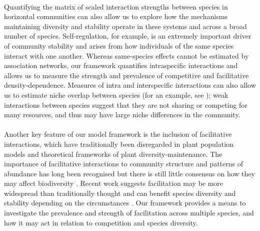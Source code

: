 \documentclass[a4,12pt]{article}
\begin{document}
    \paragraph{}
    Quantifying the matrix of scaled interaction strengths between species in horizontal communities can also allow us to explore how the mechanisms maintaining diversity and stability operate in these systems and across a broad number of species. Self-regulation, for example, is an extremely important driver of community stability \parencite{Barabas2017} and arises from how individuals of the same species interact with one another. Whereas same-species effects cannot be estimated by association networks, our framework quantifies intraspecific interactions and allows us to measure the strength and prevalence of competitive and facilitative density-dependence. Measures of intra and interspecific interactions can also allow us to estimate niche overlap between species (for an example, see \cite{Chu2015a}); weak interactions between species suggest that they are not sharing or competing for many resources, and thus may have large niche differences in the community. %

    \paragraph{}
    Another key feature of our model framework is the inclusion of facilitative interactions, which have traditionally been disregarded in plant population models and theoretical frameworks of plant diversity-maintenance. The importance of facilitative interactions to community structure and patterns of abundance has long been recognised \parencite{Callaway1997a} but there is still little consensus on how they may affect biodiversity \parencite{Bruno2003, Brooker2008}. Recent work suggests facilitation may be more widespread than traditionally thought \parencite{Gross2015, Picoche2020} and can benefit species diversity and stability depending on the circumstances \parencite{Coyte2015, Brooker2008}. Our framework provides a means to investigate the prevalence and strength of facilitation across multiple species, and how it may act in relation to competition and species diversity.  
        
\end{document}
